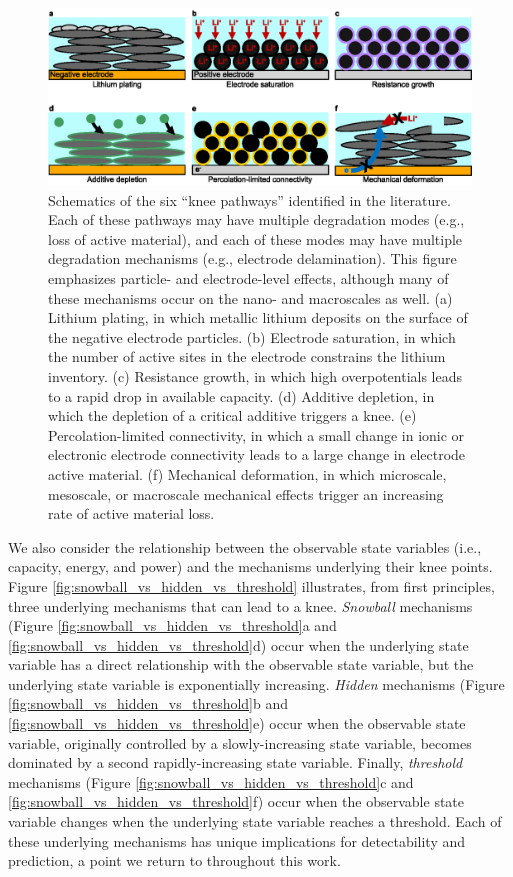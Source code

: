 \documentclass[journal=jpclcd,manuscript=article]{achemso}
\begin{document}
\begin{figure}[h!tb]
\centering
\includegraphics[scale=0.9]{figures/knee_pathways.eps}
\caption{Schematics of the six ``knee pathways'' identified in the literature. Each of these pathways may have multiple degradation modes (e.g., loss of active material), and each of these modes may have multiple degradation mechanisms (e.g., electrode delamination). This figure emphasizes particle- and electrode-level effects, although many of these mechanisms occur on the nano- and macroscales as well.
(a) Lithium plating, in which metallic lithium deposits on the surface of the negative electrode particles.
(b) Electrode saturation, in which the number of active sites in the electrode constrains the lithium inventory.
(c) Resistance growth, in which high overpotentials leads to a rapid drop in available capacity.
(d) Additive depletion, in which the depletion of a critical additive triggers a knee.
(e) Percolation-limited connectivity, in which a small change in ionic or electronic electrode connectivity leads to a large change in electrode active material.
(f) Mechanical deformation, in which microscale, mesoscale, or macroscale mechanical effects trigger an increasing rate of active material loss.}
\label{fig:knee_pathways}
\end{figure}

We also consider the relationship between the observable state variables (i.e., capacity, energy, and power) and the mechanisms underlying their knee points. Figure \ref{fig:snowball_vs_hidden_vs_threshold} illustrates, from first principles, three underlying mechanisms that can lead to a knee. \textit{Snowball} mechanisms (Figure \ref{fig:snowball_vs_hidden_vs_threshold}a and \ref{fig:snowball_vs_hidden_vs_threshold}d) occur when the underlying state variable has a direct relationship with the observable state variable, but the underlying state variable is exponentially increasing. \textit{Hidden} mechanisms (Figure \ref{fig:snowball_vs_hidden_vs_threshold}b and \ref{fig:snowball_vs_hidden_vs_threshold}e) occur when the observable state variable, originally controlled by a slowly-increasing state variable, becomes dominated by a second rapidly-increasing state variable. Finally, \textit{threshold} mechanisms (Figure \ref{fig:snowball_vs_hidden_vs_threshold}c and \ref{fig:snowball_vs_hidden_vs_threshold}f) occur when the observable state variable changes when the underlying state variable reaches a threshold. Each of these underlying mechanisms has unique implications for detectability and prediction, a point we return to throughout this work.
\end{document}
